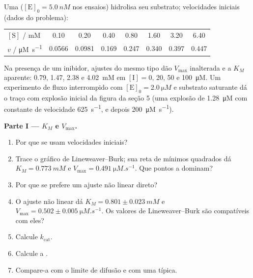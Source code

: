 \begin{problem}
\label{pb:b3:complex-kinetics:1}
Uma  ($[\mathrm E]_0 = \qty{5.0}{nM}$ nos ensaios) hidrolisa seu substrato; velocidades iniciais
(dados do problema):
\begin{center}\small
\begin{tabular}{lccccccc}
\hline
$[\mathrm S]$ / mM & 0.10 & 0.20 & 0.40 & 0.80 & 1.60 & 3.20 & 6.40 \\
$v$ / \unit{\micro M.s^{-1}} & 0.0566 & 0.0981 & 0.169 & 0.247 & 0.340 & 0.397 & 0.447 \\ \hline
\end{tabular}
\end{center}
Na presença de um inibidor, ajustes do mesmo tipo dão $V_{\max}$ inalterada e a
$K_M$ aparente: 0.79, 1.47, 2.38 e \qty{4.02}{mM} em $[\mathrm I] = 0$, 20, 50 e
\qty{100}{\micro M}. Um experimento de fluxo interrompido com $[\mathrm E]_0 = \qty{2.0}{\micro M}$ e substrato
saturante dá o traço com explosão inicial da figura da seção 5 (uma explosão de
\qty{1.28}{\micro M} com constante de velocidade \qty{625}{s^{-1}}, e depois \qty{200}{\micro M.s^{-1}}).

\medskip\noindent\textbf{Parte I --- $K_M$ e $V_{\max}$.}
\begin{enumerate}
  \item Por que se usam velocidades iniciais?
  \item Trace o gráfico de Lineweaver--Burk; sua reta de mínimos quadrados dá $K_M =
        \qty{0.773}{mM}$ e $V_{\max} = \qty{0.491}{\micro M.s^{-1}}$. Que pontos a dominam?
  \item Por que se prefere um ajuste não linear direto?
  \item O ajuste não linear dá $K_M = 0.801 \pm \qty{0.023}{mM}$ e $V_{\max} = 0.502 \pm
        \qty{0.005}{\micro M.s^{-1}}$. Os valores de Lineweaver--Burk são compatíveis com eles?
  \item Calcule $k_{\mathrm{cat}}$.
  \item Calcule a .
  \item Compare-a com o limite de difusão e com uma  típica.
\end{enumerate}


\end{problem}
